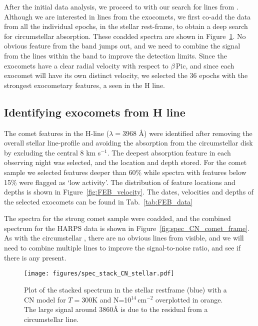 \documentclass{aa}
\newcommand{\kms}{km s$^{-1}$}
\newcommand{\bp}{$\beta$\,Pic}
\begin{document}
After the initial data analysis, we proceed to with our search for lines from .
%
Although we are interested in lines from the exocomets, we first co-add the data from all the individual epochs, in the stellar rest-frame, to obtain a deep search for circumstellar  absorption.
%
These coadded spectra %
are shown in Figure~\ref{fig:spec_CN_stellar_frame}.
%
No obvious feature from the  band jumps out, and we need to combine the signal from the lines within the  band to improve the detection limits.
%
Since the exocomets have a clear radial velocity with respect to \bp{}, and since each exocomet will have its own distinct velocity, we selected the 36 epochs with the strongest exocometary features, a seen in the  H line. 

\subsection{Identifying exocomets from \texorpdfstring{}{CaII} H line}\label{sect:FEBid}

The comet features in the  H-line ($\lambda=3968$ \AA) were identified after removing the overall stellar line-profile and avoiding the absorption from the circumstellar disk by excluding the central 8 \kms{}.
%
The deepest absorption feature in each observing night was selected, and the location and depth stored.
%
For the comet sample we selected features deeper than 60\% %
while spectra with features below 15\% %
were flagged as `low activity'.
%
The distribution of feature locations and depths is shown in Figure~\ref{fig:FEB_velocity}. The dates, velocities and depths of the selected exocomets can be found in Tab.~\ref{tab:FEB_data}

The spectra for the strong comet sample were coadded, and the combined spectrum for the HARPS data is shown in Figure~\ref{fig:spec_CN_comet_frame}.
%
As with the circumstellar , there are no obvious lines from  visible, and we will need to combine multiple lines to improve the signal-to-noise ratio, and see if there is any  present. 

\begin{figure}
    \begin{centering}
        \texttt{[image: figures/spec\_stack\_CN\_stellar.pdf]}
        \caption{Plot of the stacked spectrum in the stellar restframe (blue) with a CN model for $T=$300K and N=10$^{14}$\,cm$^{-2}$ overplotted in orange.
        The large signal around 3860\AA{} is due to the residual from a circumstellar  line.}
        \label{fig:spec_CN_stellar_frame}
    \end{centering}
\end{figure}
\end{document}
